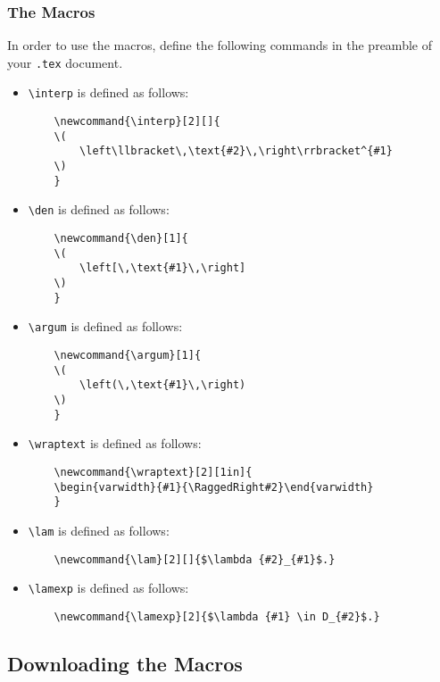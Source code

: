 \documentclass{article}
\newcommand{\interp}[2][]{
	\(
		\left\llbracket\,\text{#2}\,\right\rrbracket^{#1}
	\)
	}
\newcommand{\wraptext}[2][1in]{\begin{varwidth}{#1}{\RaggedRight#2}\end{varwidth}}
\newcommand{\lam}[2][]{$\lambda {#2}_{#1}$.}
\newcommand{\lamexp}[2]{$\lambda {#1} \in D_{#2}$.}
\newcommand{\den}[1]{
	\(
		\left[\,\text{#1}\,\right]
	\)
	}
\newcommand{\argum}[1]{
	\(
		\left(\,\text{#1}\,\right)
	\)
	}
\begin{document}
\subsubsection{The Macros}

In order to use the macros, define the following commands in the preamble of your \texttt{.tex} document.

\begin{itemize}

	\item{\verb|\interp| is defined as follows:
	\begin{verbatim}
	\newcommand{\interp}[2][]{
	\(
		\left\llbracket\,\text{#2}\,\right\rrbracket^{#1}
	\)
	}
	\end{verbatim}
	}
	
	\item{\verb|\den| is defined as follows:
	\begin{verbatim}
	\newcommand{\den}[1]{
	\(
		\left[\,\text{#1}\,\right]
	\)
	}
	\end{verbatim}
	}
	
	\item{\verb|\argum| is defined as follows:
	\begin{verbatim}
	\newcommand{\argum}[1]{
	\(
		\left(\,\text{#1}\,\right)
	\)
	}
	\end{verbatim}
	}
	
	\item{\verb|\wraptext| is defined as follows:
	\begin{verbatim}
	\newcommand{\wraptext}[2][1in]{
	\begin{varwidth}{#1}{\RaggedRight#2}\end{varwidth}
	}
	\end{verbatim}
	}
	
	\item{\verb|\lam| is defined as follows:
	\begin{verbatim}
	\newcommand{\lam}[2][]{$\lambda {#2}_{#1}$.}
	\end{verbatim}
	}
	
	\item{\verb|\lamexp| is defined as follows:
	\begin{verbatim}
	\newcommand{\lamexp}[2]{$\lambda {#1} \in D_{#2}$.}
	\end{verbatim}
	}	

\end{itemize}

\subsection{Downloading the Macros}
\end{document}
